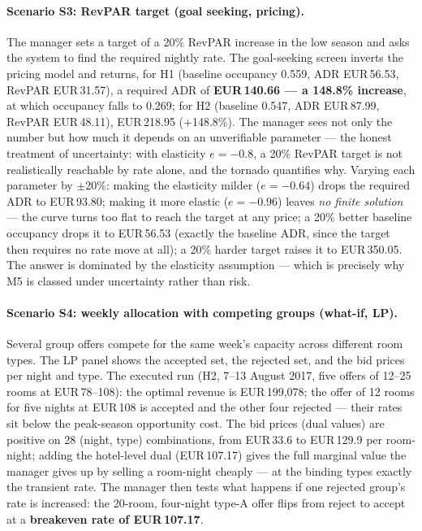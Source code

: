 \paragraph{Scenario S3: RevPAR target (goal seeking, pricing).}
The manager sets a target of a 20\% RevPAR increase in the low season and asks the system to find the required nightly rate. The goal-seeking screen inverts the pricing model and returns, for H1 (baseline occupancy 0.559, ADR EUR\,56.53, RevPAR EUR\,31.57), a required ADR of \textbf{EUR\,140.66 --- a 148.8\% increase}, at which occupancy falls to 0.269; for H2 (baseline 0.547, ADR EUR\,87.99, RevPAR EUR\,48.11), EUR\,218.95 (+148.8\%). The manager sees not only the number but how much it depends on an unverifiable parameter --- the honest treatment of uncertainty: with elasticity $e = -0.8$, a 20\% RevPAR target is not realistically reachable by rate alone, and the tornado quantifies why. Varying each parameter by $\pm$20\%: making the elasticity milder ($e = -0.64$) drops the required ADR to EUR\,93.80; making it more elastic ($e = -0.96$) leaves \emph{no finite solution} --- the curve turns too flat to reach the target at any price; a 20\% better baseline occupancy drops it to EUR\,56.53 (exactly the baseline ADR, since the target then requires no rate move at all); a 20\% harder target raises it to EUR\,350.05. The answer is dominated by the elasticity assumption --- which is precisely why M5 is classed under uncertainty rather than risk.

\paragraph{Scenario S4: weekly allocation with competing groups (what-if, LP).}
Several group offers compete for the same week's capacity across different room types. The LP panel shows the accepted set, the rejected set, and the bid prices per night and type. The executed run (H2, 7--13 August 2017, five offers of 12--25 rooms at EUR\,78--108): the optimal revenue is EUR\,199{,}078; the offer of 12 rooms for five nights at EUR\,108 is accepted and the other four rejected --- their rates sit below the peak-season opportunity cost. The bid prices (dual values) are positive on 28 (night, type) combinations,
from EUR\,33.6 to EUR\,129.9 per room-night; adding the hotel-level dual
(EUR\,107.17) gives the full marginal value the manager gives up by selling a
room-night cheaply --- at the binding types exactly the transient rate. The manager then tests what happens if one rejected group's rate is increased: the 20-room, four-night type-A offer flips from reject to accept at a \textbf{breakeven rate of EUR\,107.17}.

